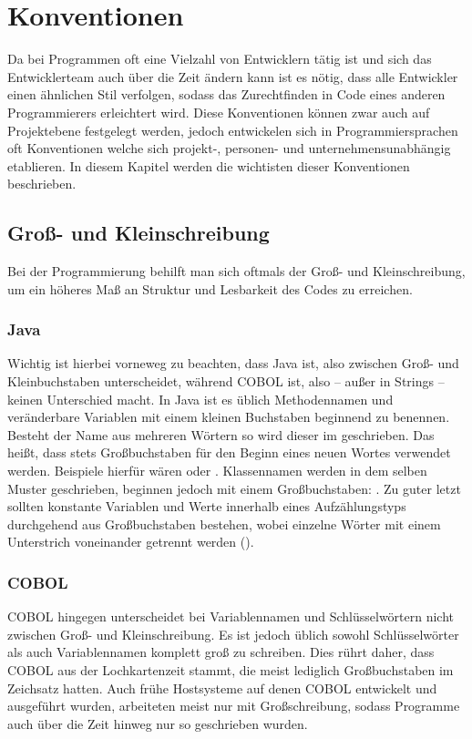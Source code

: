 \section{Konventionen}
Da bei Programmen oft eine Vielzahl von Entwicklern tätig ist und sich das Entwicklerteam auch über die Zeit ändern kann ist es nötig, dass alle Entwickler einen ähnlichen Stil verfolgen, sodass das Zurechtfinden in Code eines anderen Programmierers erleichtert wird. Diese Konventionen können zwar auch auf Projektebene festgelegt werden, jedoch entwickelen sich in Programmiersprachen oft Konventionen welche sich projekt-, personen- und unternehmensunabhängig etablieren. In diesem Kapitel werden die wichtisten dieser Konventionen beschrieben.

\subsection*{Groß- und Kleinschreibung}
Bei der Programmierung behilft man sich oftmals der Groß- und Kleinschreibung, um ein höheres Maß an Struktur und Lesbarkeit des Codes zu erreichen.

\subsubsection*{Java}
Wichtig ist hierbei vorneweg zu beachten, dass Java  ist, also zwischen Groß- und Kleinbuchstaben unterscheidet, während COBOL  ist, also -- außer in Strings -- keinen Unterschied macht.
In Java ist es üblich Methodennamen und veränderbare Variablen mit einem kleinen Buchstaben beginnend zu benennen. Besteht der Name aus mehreren Wörtern so wird dieser im  geschrieben. Das heißt, dass stets Großbuchstaben für den Beginn eines neuen Wortes verwendet werden. Beispiele hierfür wären  oder . Klassennamen werden in dem selben Muster geschrieben, beginnen jedoch mit einem Großbuchstaben: . Zu guter letzt sollten konstante Variablen und Werte innerhalb eines Aufzählungstyps durchgehend aus Großbuchstaben bestehen, wobei einzelne Wörter mit einem Unterstrich voneinander getrennt werden (). 
\subsubsection*{COBOL}
COBOL hingegen unterscheidet bei Variablennamen und Schlüsselwörtern nicht zwischen Groß- und Kleinschreibung. Es ist jedoch üblich sowohl Schlüsselwörter als auch Variablennamen komplett groß zu schreiben. Dies rührt daher, dass COBOL aus der Lochkartenzeit stammt, die meist lediglich Großbuchstaben im Zeichsatz hatten. Auch frühe Hostsysteme auf denen COBOL entwickelt und ausgeführt wurden, arbeiteten meist nur mit Großschreibung, sodass Programme auch über die Zeit hinweg nur so geschrieben wurden.


